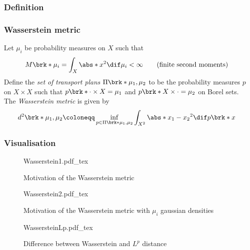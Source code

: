 \subsubsection{Definition}
\begin{frame}
  \frametitle{Wasserstein metric}
  \begin{definition}
    Let $\mu_i$ be probability measures on $X$ such that
    \begin{align*}
      M\brk*{\mu_i}=\int_X\abs*{x}^2\dif\mu_i<\infty \qquad\text{(finite second moments)}
    \end{align*}
    Define the \emph{set of transport plans} $\Pi\brk*{\mu_1,\mu_2}$ to be the probability measures $p$ on $X\times X$
    such that $p\brk*{\cdot\times X}=\mu_1$ and $p\brk*{X\times\cdot}=\mu_2$ on Borel sets.
    The \emph{Wasserstein metric} is given by 
    \begin{align*}
      d^2\brk*{\mu_1,\mu_2}\coloneqq\inf_{p\in\Pi\brk*{\mu_1,\mu_2}}\int_{X^2}\abs*{x_1-x_2}^2\dif p\brk*{x}
    \end{align*}
  \end{definition}
\end{frame}

\subsubsection{Visualisation}
\begin{frame}
  \begin{figure}
    {Wasserstein1.pdf_tex}
    \caption{Motivation of the Wasserstein metric}
  \end{figure}
\end{frame}

\begin{frame}
  \begin{figure}
    {Wasserstein2.pdf_tex}
    \caption{Motivation of the Wasserstein metric with $\mu_i$ gaussian densities}
  \end{figure}
\end{frame}

\begin{frame}
  \begin{figure}
    \def\svgwidth{7cm}
    {WassersteinLp.pdf_tex}
    \caption{Difference between Wasserstein and $L^p$ distance}
  \end{figure}
\end{frame}

